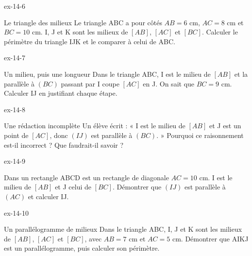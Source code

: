 \begin{blocLivre}{ex-14-6}\begin{exercice}[2]{Le triangle des milieux}
Le triangle ABC a pour côtés $AB=6$ cm, $AC=8$ cm et $BC=10$ cm. I, J et K sont les milieux de $[AB]$, $[AC]$ et $[BC]$. Calculer le périmètre du triangle IJK et le comparer à celui de ABC.
\label{fig-ex-14-6}
\end{exercice}\end{blocLivre}
\begin{blocLivre}{ex-14-7}\begin{exercice}[2]{Un milieu, puis une longueur}
Dans le triangle ABC, I est le milieu de $[AB]$ et la parallèle à $(BC)$ passant par I coupe $[AC]$ en J. On sait que $BC=9$ cm. Calculer IJ en justifiant chaque étape.
\label{fig-ex-14-7}
\end{exercice}\end{blocLivre}
\begin{blocLivre}{ex-14-8}\begin{exercice}[2]{Une rédaction incomplète}
Un élève écrit : « I est le milieu de $[AB]$ et J est un point de $[AC]$, donc $(IJ)$ est parallèle à $(BC)$. » Pourquoi ce raisonnement est-il incorrect ? Que faudrait-il savoir ?
\label{fig-ex-14-8}
\end{exercice}\end{blocLivre}
\begin{blocLivre}{ex-14-9}\begin{exercice}[2]{Dans un rectangle}
ABCD est un rectangle de diagonale $AC=10$ cm. I est le milieu de $[AB]$ et J celui de $[BC]$. Démontrer que $(IJ)$ est parallèle à $(AC)$ et calculer IJ.
\label{fig-ex-14-9}
\end{exercice}\end{blocLivre}
\begin{blocLivre}{ex-14-10}\begin{exercice}[2]{Un parallélogramme de milieux}
Dans le triangle ABC, I, J et K sont les milieux de $[AB]$, $[AC]$ et $[BC]$, avec $AB=7$ cm et $AC=5$ cm. Démontrer que AIKJ est un parallélogramme, puis calculer son périmètre.
\label{fig-ex-14-10}
\end{exercice}\end{blocLivre}

